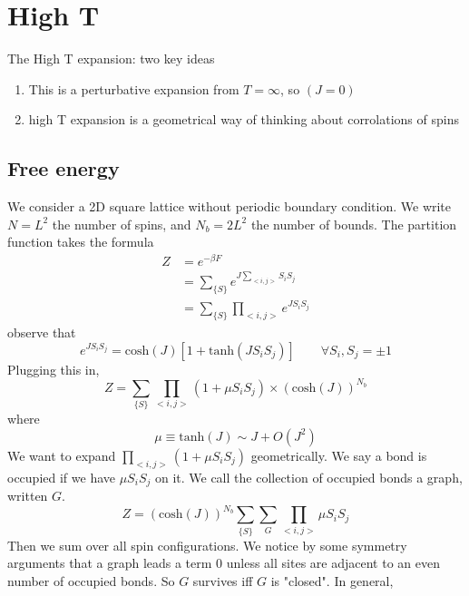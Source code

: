 \documentclass[a4paper]{book}
\theoremstyle{definition}
\theoremstyle{remark}
\begin{document}
\section{High T}

The High T expansion: two key ideas 
\begin{enumerate}
    \item This is a perturbative expansion from $T = \infty$, so $(J=0)$ 
    \item high T expansion is a geometrical way of thinking about corrolations of spins 
\end{enumerate}

\subsection{Free energy}
We consider a 2D square lattice without periodic boundary condition. We write $N = L^2$ the number of spins, and $N_b = 2L^2$ the number of bounds. The partition function takes the formula
\begin{equation}
    \begin{aligned}
        Z &= e^{-\beta F} \\
        &= \sum_{\{S\}} e^{J\sum_{<i, j>}S_iS_j} \\
        &= \sum_{\{S\}} \prod_{<i, j>}e^{JS_iS_j} 
    \end{aligned}
\end{equation}
observe that 
\begin{equation}
    e^{JS_iS_j} = \text{cosh}(J)[1 + \text{tanh}(JS_iS_j)] \qquad \forall S_i, S_j = \pm 1
\end{equation}
Plugging this in,
\begin{equation}
    Z = \sum_{\{S\}} \prod_{<i,j>} (1 + \mu S_iS_j) \times (\text{cosh}(J))^{N_b} 
\end{equation}
where 
\begin{equation}
    \mu  \equiv \text{tanh} (J) \sim J + O(J^2)
\end{equation}
We want to expand $\prod_{<i,j>} (1 + \mu S_iS_j)$ geometrically. We say a bond is occupied if we have $\mu S_iS_j$ on it. We call the collection of occupied bonds a graph, written $G$. 
\begin{equation}
    Z = (\text{cosh}(J))^{N_b}\sum_{\{S\}}\sum_G \prod_{<i,j>} \mu S_i S_j
\end{equation}
Then we sum over all spin configurations. We notice by some symmetry arguments that a graph leads a term 0 unless all sites are adjacent to an even number of occupied bonds. So $G$ survives iff $G$ is "closed". In general, 
\end{document}
